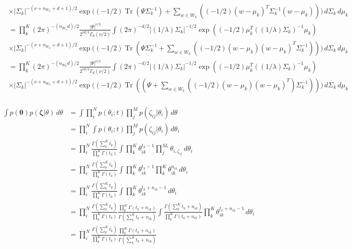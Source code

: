 \documentclass[12pt]{article}
\DeclareMathOperator{\Tr}{Tr}
\begin{document}
\begin{align*}
& \times  |\Sigma_k|^{-(\nu + n_{W_k} + d + 1)/2} \exp{((-1/2) \Tr{(\Psi \Sigma_k^{-1})} + \sum_{w \in W_k} ((-1/2)(w - \mu_{k})^T\Sigma_{k}^{-1}(w - \mu_{k}))})  \,d\Sigma_k  \,d\mu_k \\
& = \prod^{K}_{k} (2\pi)^{-(n_{W_k}d)/2}\frac{|\Psi|^{\nu/2}}{2^{\nu d/2}\Gamma_d(\nu/2)} \int (2\pi)^{-d/2} |(1/\lambda)\Sigma_k|^{-1/2} \exp{((-1/2)\mu_k^T((1/\lambda)\Sigma_k)^{-1}\mu_k)} \\
& \times  |\Sigma_k|^{-(\nu + n_{W_k} + d + 1)/2} \exp{((-1/2) \Tr{(\Psi \Sigma_k^{-1} + \sum_{w \in W_k} ((-1/2)(w - \mu_{k})(w - \mu_{k})^T\Sigma_{k}^{-1}))}})  \,d\Sigma_k  \,d\mu_k \\
& = \prod^{K}_{k} (2\pi)^{-(n_{W_k}d)/2}\frac{|\Psi|^{\nu/2}}{2^{\nu d/2}\Gamma_d(\nu/2)} \int (2\pi)^{-d/2} |(1/\lambda)\Sigma_k|^{-1/2} \exp{((-1/2)\mu_k^T((1/\lambda)\Sigma_k)^{-1}\mu_k)} \\
& \times  |\Sigma_k|^{-(\nu + n_{W_k} + d + 1)/2} \exp{((-1/2) \Tr{((\Psi + \sum_{w \in W_k} ((-1/2)(w - \mu_{k})(w - \mu_{k})^T)\Sigma_{k}^{-1}))}})  \,d\Sigma_k  \,d\mu_k \\
\end{align*}

\begin{align*}
\int p(\bm{\theta})p(\bm{\zeta} | \theta) \,d\theta  & = \int \prod^N_{i}p(\theta_i; t)\prod^M_{j}p(\zeta_{ij} | \theta_i) \,d\theta \\
 & = \prod^N_{i} \int p(\theta_i; t)\prod^M_{j}p(\zeta_{ij} | \theta_i) \,d\theta_i \\
 & = \prod^N_{i} \frac{\Gamma(\sum^K_{k} t_k)}{\prod^K_{k} \Gamma(t_k)} \int \prod^K_{k} \theta_{ik}^{t_k - 1} \prod^{M_i}_{j} \theta_{i, \zeta_{ij}} \,d\theta_i \\
  & = \prod^N_{i} \frac{\Gamma(\sum^K_{k} t_k)}{\prod^K_{k} \Gamma(t_k)} \int \prod^K_{k} \theta_{ik}^{t_k - 1} \prod^K_{k} \theta_{ik}^{n_{ik}} \,d\theta_i \\
    & = \prod^N_{i} \frac{\Gamma(\sum^K_{k} t_k)}{\prod^K_{k} \Gamma(t_k)} \int \prod^K_{k} \theta_{ik}^{t_k + n_{ik} - 1} \,d\theta_i \\
        & = \prod^N_{i} \frac{\Gamma(\sum^K_{k} t_k)}{\prod^K_{k} \Gamma(t_k)} \frac{\prod^K_{k} \Gamma(t_k + n_{ik}) }{\Gamma(\sum^K_{k} t_k + n_{ik})} \int \frac{\Gamma(\sum^K_{k} t_k + n_{ik})}{\prod^K_{k} \Gamma(t_k + n_{ik})} \prod^K_{k} \theta_{ik}^{t_k + n_{ik} - 1} \,d\theta_i \\
        & = \prod^N_{i} \frac{\Gamma(\sum^K_{k} t_k)}{\prod^K_{k} \Gamma(t_k)} \frac{\prod^K_{k} \Gamma(t_k + n_{ik}) }{\Gamma(\sum^K_{k} t_k + n_{ik})} \\
\end{align*}
\end{document}
